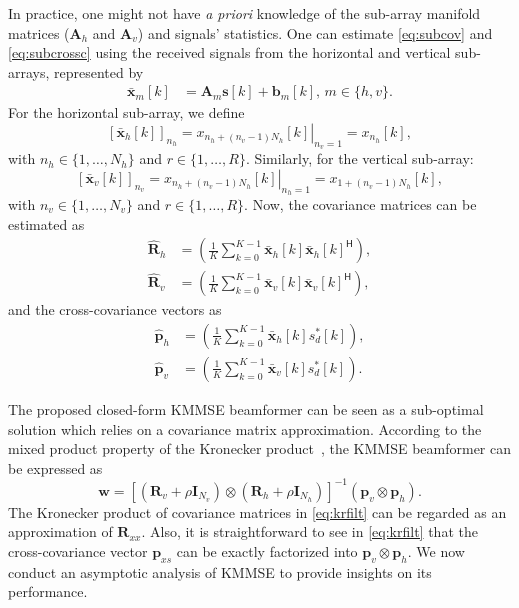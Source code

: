 \documentclass{cta-author}
\newcommand{\hermit}{\mathsf{H}}					%
\newcommand{\Rxx}{\bm{R}_{xx}}
\begin{document}
In practice, one might not have \emph{a priori} knowledge of the sub-array manifold matrices ($\bm{A}_h$ and $\bm{A}_v$) and signals' statistics. One can estimate \eqref{eq:subcov} and \eqref{eq:subcrossc} using the received signals from the horizontal and vertical sub-arrays, represented by
\begin{align}
\bar{\bm{x}}_m[k] &= \bm{A}_m \bm{s}[k] + \bm{b}_m[k],\,m \in \{h, v\}. \label{eq:xh}
\end{align}
For the horizontal sub-array, we define 
\[[\bar{\bm{x}}_h[k]]_{n_h} = \left. x_{n_h + (n_v-1)N_h} [k]\right|_{n_v=1} = x_{n_h}[k],\] 
with $n_h \in \{1,\ldots,N_h\}$ and $r \in \{1,\ldots,R\}$. Similarly, for the vertical sub-array: 
\[[\bar{\bm{x}}_v[k]]_{n_v} = \left. x_{{n_h + (n_v-1)N_h}} [k]\right|_{n_h=1} = x_{1+(n_v-1)N_h}[k],\] 
with $n_v \in \{1,\ldots, N_v\}$ and $r \in \{1,\ldots,R\}$. Now, the covariance matrices can be estimated as
\begin{align}
\hat{\bm{R}}_h &=\left( \frac{1}{K} \sum_{k=0}^{K-1} \bar{\bm{x}}_h[k] \bar{\bm{x}}_h[k]^\hermit \right),\\
\hat{\bm{R}}_v &= \left( \frac{1}{K} \sum_{k=0}^{K-1} \bar{\bm{x}}_v[k] \bar{\bm{x}}_v[k]^\hermit \right),
\end{align}
and the cross-covariance vectors as
\begin{align}
\hat{\bm{p}}_{h} &= \left( \frac{1}{K} \sum_{k=0}^{K-1} \bar{\bm{x}}_h[k] s_d^*[k] \right),\\
\hat{\bm{p}}_{v} &= \left( \frac{1}{K} \sum_{k=0}^{K-1} \bar{\bm{x}}_v[k] s_d^*[k] \right).
\end{align}

The proposed closed-form KMMSE beamformer can be seen as a sub-optimal solution which relies on a covariance matrix approximation. According to the mixed product property of the Kronecker product~\cite{liu_hadamard_2008}, the KMMSE beamformer can be expressed as
\begin{equation} \label{eq:krfilt}
\bm{w} = \left[ (\bm{R}_v + \rho \bm{I}_{N_v}) \otimes (\bm{R}_h + \rho \bm{I}_{N_h}) \right]^{-1} (\bm{p}_{v} \otimes \bm{p}_{h}).
\end{equation}
The Kronecker product of covariance matrices in \eqref{eq:krfilt} can be regarded as an approximation of $\Rxx$. Also, it is straightforward to see in \eqref{eq:krfilt} that the cross-covariance vector $\bm{p}_{xs}$ can be exactly factorized into $\bm{p}_{v} \otimes \bm{p}_{h}$. We now conduct an asymptotic analysis of KMMSE to provide insights on its performance.
\end{document}
